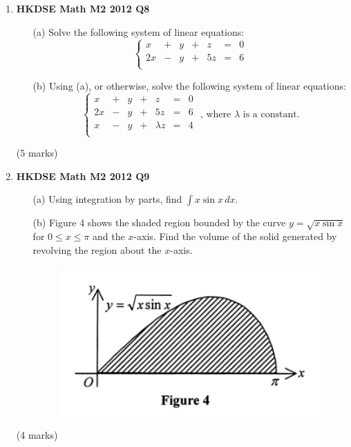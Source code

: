 \documentclass[12pt]{article}
\begin{document}
\begin{enumerate}
	\item \textbf{HKDSE Math M2 2012 Q8}
	\begin{enumerate}
		\item [(a)]Solve the following system of linear equations:
		$$\left\{\begin{matrix}
			x & + & y & + & z & = & 0\\
			2x & - & y & + & 5z & = & 6\\
		\end{matrix}\right.$$
		\item [(b)]Using (a), or otherwise, solve the following system of linear equations: 
		$$\left\{\begin{matrix}
			x & + & y & + & z & = & 0\\
			2x & - & y & + & 5z & = & 6\\
			x & - & y & + & \lambda z & = & 4\\
		\end{matrix}\right.\text{ , where }\lambda\text{ is a constant.}$$ 
	\end{enumerate}
	(5 marks)

	\item \textbf{HKDSE Math M2 2012 Q9}
	\begin{enumerate}
		\item [(a)]Using integration by parts, find $\int x\sin{x}\,dx$. 
		\item [(b)]Figure 4 shows the shaded region bounded by the curve $y = \sqrt{x\sin{x}}$ for $0 \leq x \leq \pi$ and the $x$-axis. Find the volume of the solid generated by revolving the region about the $x$-axis.
	\begin{figure}[H]
		\centering
		\includegraphics[width = .5\linewidth]{2012Figure4}
	\end{figure}
	\end{enumerate}
	(4 marks)



\end{enumerate}
\end{document}
